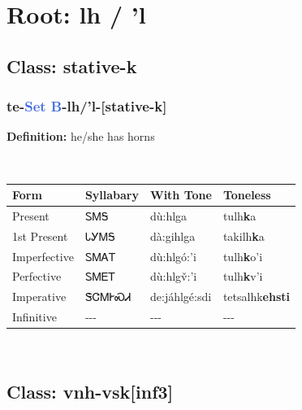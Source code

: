 \needspace{4in}
\section*{Root: lh / 'l}
\nopagebreak
{}
\needspace{3in}
\subsection*{Class: stative-k}
\nopagebreak
\needspace{2in}
\subsubsection*{te{-}\textcolor{RoyalBlue}{Set B}{-}\textbf{lh/'l}{-}[stative-k]}
\nopagebreak
\textbf{Definition: } he/she has horns
\\[0.5em]
\begin{tabularx}{\textwidth}{l X X X}%
\toprule%
\textbf{Form}&\textbf{Syllabary}&\textbf{With Tone}&\textbf{Toneless}\\%
\midrule%
Present&ᏚᎷᎦ&dù:hlga&tulh\textbf{k}a\\%
1st Present&ᏓᎩᎷᎦ&dà:gihlga&takilh\textbf{k}a\\%
Imperfective&ᏚᎷᎪᎢ&dù:hlgó:’i&tulh\textbf{k}o'i\\%
Perfective&ᏚᎷᎬᎢ&dù:hlgv̌:’i&tulh\textbf{k}v'i\\%
Imperative&ᏕᏣᎷᎨᏍᏗ&de:jáhlgé:sdi&tetsalhk\textbf{ehsti}\\%
Infinitive&{-}{-}{-}&{-}{-}{-}&{-}{-}{-}\\%
\bottomrule%
\end{tabularx}
\\[1em]
\needspace{3in}
\subsection*{Class: vnh-vsk[inf3]}
\nopagebreak
\needspace{2in}
